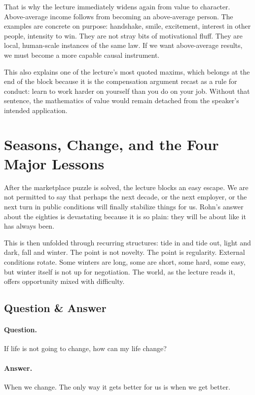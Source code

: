 That is why the lecture immediately widens again from value to character. Above-average income follows from becoming an above-average person. The examples are concrete on purpose: handshake, smile, excitement, interest in other people, intensity to win. They are not stray bits of motivational fluff. They are local, human-scale instances of the same law. If we want above-average results, we must become a more capable causal instrument.

This also explains one of the lecture's most quoted maxims, which belongs at the end of the block because it is the compensation argument recast as a rule for conduct: learn to work harder on yourself than you do on your job. Without that sentence, the mathematics of value would remain detached from the speaker's intended application.

\section{Seasons, Change, and the Four Major Lessons}

After the marketplace puzzle is solved, the lecture blocks an easy escape. We are not permitted to say that perhaps the next decade, or the next employer, or the next turn in public conditions will finally stabilize things for us. Rohn's answer about the eighties is devastating because it is so plain: they will be about like it has always been.

This is then unfolded through recurring structures: tide in and tide out, light and dark, fall and winter. The point is not novelty. The point is regularity. External conditions rotate. Some winters are long, some are short, some hard, some easy, but winter itself is not up for negotiation. The world, as the lecture reads it, offers opportunity mixed with difficulty.

\subsection{Question \& Answer}

\paragraph{Question.} If life is not going to change, how can my life change?

\paragraph{Answer.} When we change. The only way it gets better for us is when we get better.

